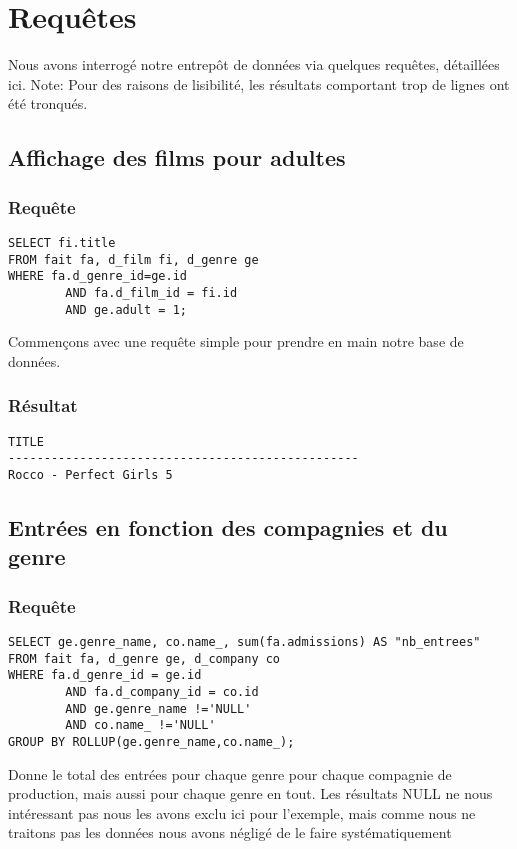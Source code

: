 \section{Requêtes}

Nous avons interrogé notre entrepôt de données via quelques requêtes, détaillées ici.
Note: Pour des raisons de lisibilité, les résultats comportant trop de lignes ont été tronqués.

\subsection{Affichage des films pour adultes}
\subsubsection{Requête}
\begin{lstlisting}
SELECT fi.title
FROM fait fa, d_film fi, d_genre ge
WHERE fa.d_genre_id=ge.id
		AND fa.d_film_id = fi.id
		AND ge.adult = 1;
\end{lstlisting}
Commençons avec une requête simple pour prendre en main notre base de données.
\subsubsection{Résultat}
\begin{lstlisting}
TITLE
-------------------------------------------------
Rocco - Perfect Girls 5
\end{lstlisting}

\subsection{Entrées en fonction des compagnies et du genre}
\subsubsection{Requête}
\begin{lstlisting}
SELECT ge.genre_name, co.name_, sum(fa.admissions) AS "nb_entrees"
FROM fait fa, d_genre ge, d_company co
WHERE fa.d_genre_id = ge.id
		AND fa.d_company_id = co.id
		AND ge.genre_name !='NULL'
		AND co.name_ !='NULL'
GROUP BY ROLLUP(ge.genre_name,co.name_);
\end{lstlisting}
Donne le total des entrées pour chaque genre pour chaque compagnie de production, mais aussi pour chaque genre en tout.
Les résultats NULL ne nous intéressant pas nous les avons exclu ici pour l'exemple, mais comme nous ne traitons pas les données nous avons négligé de le faire systématiquement
